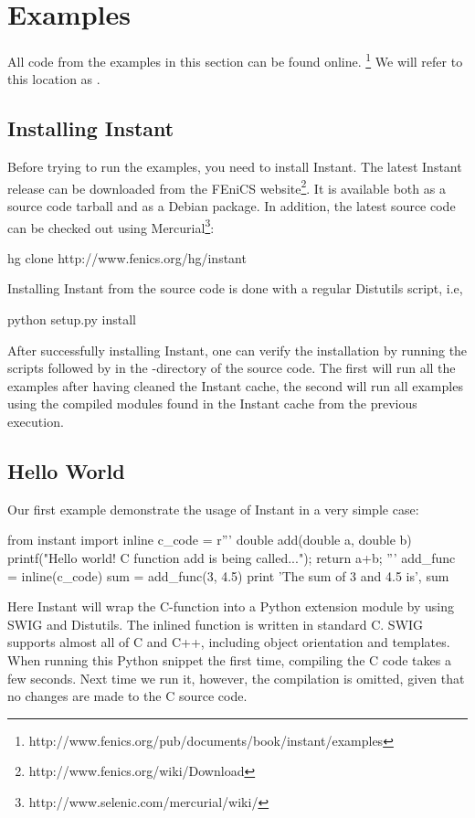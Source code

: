 \section{Examples}
\label{sec:examples}
All code from the examples in this section can be found online.
\footnote{http://www.fenics.org/pub/documents/book/instant/examples} We will refer
to this location as .

\subsection{Installing Instant}
Before trying to run the examples, you need to install Instant.
The latest Instant release can be downloaded from the FEniCS
website\footnote{http://www.fenics.org/wiki/Download}. It is
available both as a source code tarball and as a Debian package. In addition, the latest
source code can be checked out using
Mercurial\footnote{http://www.selenic.com/mercurial/wiki/}:
\begin{code}
hg clone http://www.fenics.org/hg/instant
\end{code}
Installing Instant
from the source code is done with a regular Distutils script, i.e,  
\begin{code}
python setup.py install
\end{code}
After successfully
installing Instant, one can verify the installation by running the scripts
 followed by  in the
-directory of the source code. The first will run all the examples after having
cleaned the Instant cache, the second will run all examples using the
compiled modules found in the Instant cache from the previous execution. 


\subsection{Hello World}
Our first example demonstrate the usage of Instant in a very simple case:
\begin{code}
from instant import inline
c_code = r'''
double add(double a, double b)
{
  printf("Hello world! C function add is being called...\n");
  return a+b;
}'''
add_func = inline(c_code)
sum = add_func(3, 4.5)
print 'The sum of 3 and 4.5 is', sum
\end{code}
Here Instant will wrap the C-function  into a Python extension module by using
SWIG and Distutils. 
The inlined function is written in standard C. SWIG supports almost
all of C and C++, including object orientation and templates. When running
this Python snippet the first time, compiling the C code takes a few seconds. Next time we run
it, however, the compilation is omitted, given that no changes are made to the
C source code. 

